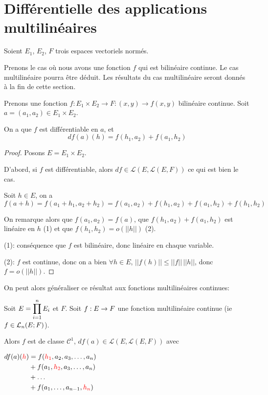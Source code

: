 \section{Différentielle des applications multilinéaires}

Soient $E_{1}$, $E_{2}$, $F$ trois espaces vectoriels normés.

Prenons le cas où nous avons une fonction $f$ qui est bilinéaire continue. Le cas
multilinéaire pourra être déduit. Les résultats du cas multilinéaire seront
donnés à la fin de cette section.

\begin{proposition}
	\label{bilinear_differential_application}
	Prenons une fonction $f : E_{1} \times E_{2} \rightarrow F : (x, y) \rightarrow
	f(x, y)$ bilinéaire continue. Soit $a = (a_{1}, a_{2}) \in E_{1} \times E_{2}$.

	On a que $f$ est différentiable en $a$, et
	\begin{equation*}
		df(a)(h) = f(h_{1}, a_{2}) + f(a_{1}, h_{2})
	\end{equation*}
\end{proposition}

\ifdefined\outputproof
\begin{proof}
	Posons $E = E_{1} \times E_{2}$.

	D'abord, si $f$ est différentiable, alors $df \in
	\mathcal{L}(E, \mathcal{L}(E, F))$ ce qui est bien
	le cas.

	Soit $h \in E$, on a
	$f(a + h) = f(a_{1} + h_{1}, a_{2} + h_{2}) =
	f(a_{1}, a_{2}) + f(h_{1}, a_{2}) + f(a_{1}, h_{2}) + f(h_{1}, h_{2})$

	On remarque alors que $f(a_{1}, a_{2}) = f(a)$, que $f(h_{1}, a_{2}) +
	f(a_{1}, h_{2})$ est linéaire en $h$ (1) et que $f(h_{1}, h_{2}) = o(||h||)$
	(2).

	(1): conséquence que $f$ est bilinéaire, donc linéaire en chaque variable.

	(2): $f$ est continue, donc on a bien $\forall h \in E$, $||f(h)|| \leq
	||f|| \, ||h||$, donc $f = o(||h||)$.
\end{proof}
\fi

On peut alors généraliser ce résultat aux fonctions multilinéaires continues:

\begin{proposition}
\label{multilinear_differential_application}
	Soit $E = \GSprodSet{i}{1}{n}{E}$ et $F$.
	Soit $\GSfunction{f}{E}{F}$ une fonction multilinéaire continue (ie $f \in
	\GScontinueHomo[n]{E}{F}$).

	Alors $f$ est de classe $\mathcal{C}^{1}$,
	$df(a) \in \mathcal{L}(E, \mathcal{L}(E, F))$ avec

	$
	\begin{aligned}
		df(a)(\textcolor{red}{h})
	&=	f(\textcolor{red}{h_{1}}, a_{2}, a_{3}, \ldots, a_{n}) \\
	&+	f(a_{1}, \textcolor{red}{h_{2}}, a_{3}, \ldots, a_{n}) \\
	&+	\ldots \\
	&+	f(a_{1}, \ldots, a_{n-1}, \textcolor{red}{h_{n}})
	\end{aligned}
	$
\end{proposition}
